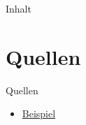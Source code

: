 \documentclass[compress]{beamer}
\title{}
\author{Justus Klameth}
\institute{}
\begin{document}
    \frame{\titlepage}

    \begin{frame}{Inhalt}
        \tableofcontents
    \end{frame}

    \section*{Quellen}

    \begin{frame}{Quellen}
        
        \begin{itemize}
            \item \url{Beispiel}
        \end{itemize}

    \end{frame}
\end{document}
